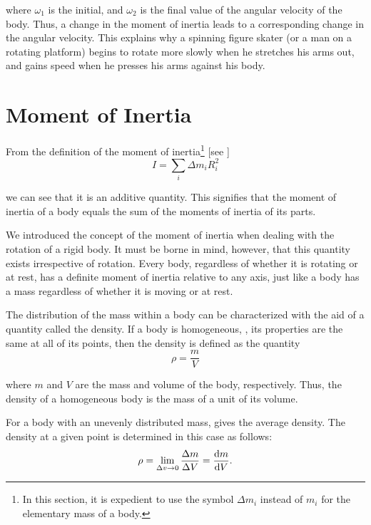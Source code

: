 \noindent
where $\omega_1$ is the initial, and $\omega_2$ is the final value of the angular velocity of the body. Thus, a change in the moment of inertia leads to a corresponding change in the angular velocity. This explains why a spinning figure skater (or a man on a rotating platform) begins to rotate more slowly when he stretches his arms out, and gains speed when he presses his arms against his body.

\section{Moment of Inertia}\label{sec:5_4}

From the definition of the moment of inertia\footnote{In this section, it is expedient to use the symbol $\Delta m_i$ instead of $m_i$ for the elementary mass of a body.} [see ]
\begin{equation*}
I = \sum_i \Delta m_i R_i^2
\end{equation*}

\noindent
we can see that it is an additive quantity. This signifies that the moment of inertia of a body equals the sum of the moments of inertia of its parts.

We introduced the concept of the moment of inertia when dealing with the rotation of a rigid body. It must be borne in mind, however, that this quantity exists irrespective of rotation. Every body, regardless of whether it is rotating or at rest, has a definite moment of inertia relative to any axis, just like a body has a mass regardless of whether it is moving or at rest.

The distribution of the mass within a body can be characterized with the aid of a quantity called the density. If a body is homogeneous, \ie, its properties are the same at all of its points, then the density is defined as the quantity
\begin{equation}\label{eq:5_17}
\rho = \frac{m}{V}
\end{equation}

\noindent
where $m$ and $V$ are the mass and volume of the body, respectively. Thus, the density of a homogeneous body is the mass of a unit of its volume.

For a body with an unevenly distributed mass,  gives the average density. The density at a given point is determined in this case as follows:
\begin{equation}\label{eq:5_18}
\rho = \lim_{\Delta v\to 0} \frac{\Delta m}{\Delta V} = \frac{\mathrm{d} m}{\mathrm{d} V}.
\end{equation}

